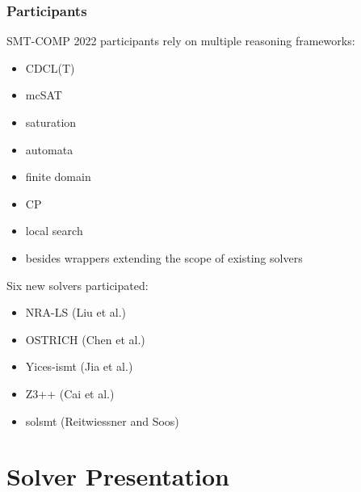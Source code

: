 \documentclass[table]{beamer}
\begin{document}
\begin{frame}
  \frametitle{Participants}

  SMT-COMP 2022 participants rely on multiple reasoning frameworks:
  \begin{itemize}
  \item CDCL(T)
  \item mcSAT
  \item saturation
  \item automata
  \item finite domain
  \item CP
  \item local search
  \item besides wrappers extending the scope of existing solvers
  \end{itemize}

  \bigskip
  Six new solvers participated:
  \begin{itemize}
  \item NRA-LS   {\footnotesize (Liu et al.)}
  \item OSTRICH {\footnotesize (Chen et al.)}
  \item Yices-ismt {\footnotesize (Jia et al.)}
  \item Z3++ {\footnotesize (Cai et al.)}
  \item solsmt {\footnotesize (Reitwiessner and Soos)}
  \end{itemize}

\end{frame}

\section{Solver Presentation}


{
\begin{frame}
  \vspace*{-1pt}%
  \noindent{}
\end{frame}
}
\end{document}
